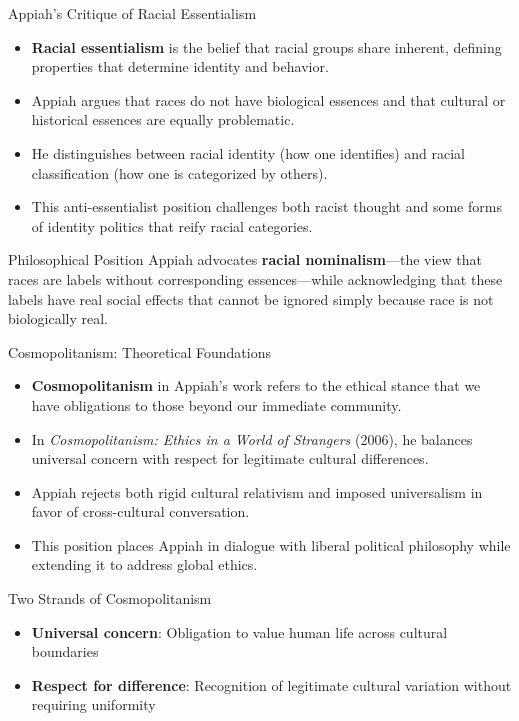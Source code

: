 \documentclass{beamer}
\begin{document}
	\begin{frame}{Appiah's Critique of Racial Essentialism}
		\begin{itemize}
			\item \textbf{Racial essentialism} is the belief that racial groups share inherent, defining properties that determine identity and behavior.
			\item Appiah argues that races do not have biological essences and that cultural or historical essences are equally problematic.
			\item He distinguishes between racial identity (how one identifies) and racial classification (how one is categorized by others).
			\item This anti-essentialist position challenges both racist thought and some forms of identity politics that reify racial categories.
		\end{itemize}
		
		\begin{exampleblock}{Philosophical Position}
			Appiah advocates \textbf{racial nominalism}—the view that races are labels without corresponding essences—while acknowledging that these labels have real social effects that cannot be ignored simply because race is not biologically real.
		\end{exampleblock}
	\end{frame}
	
	\begin{frame}{Cosmopolitanism: Theoretical Foundations}
		\begin{itemize}
			\item \textbf{Cosmopolitanism} in Appiah's work refers to the ethical stance that we have obligations to those beyond our immediate community.
			\item In \textit{Cosmopolitanism: Ethics in a World of Strangers} (2006), he balances universal concern with respect for legitimate cultural differences.
			\item Appiah rejects both rigid cultural relativism and imposed universalism in favor of cross-cultural conversation.
			\item This position places Appiah in dialogue with liberal political philosophy while extending it to address global ethics.
		\end{itemize}
		
		\begin{block}{Two Strands of Cosmopolitanism}
			\begin{itemize}
				\item \textbf{Universal concern}: Obligation to value human life across cultural boundaries
				\item \textbf{Respect for difference}: Recognition of legitimate cultural variation without requiring uniformity
			\end{itemize}
		\end{block}
	\end{frame}
	
\end{document}

